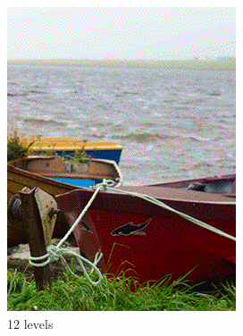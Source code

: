 \documentclass[]{article}
\begin{document}
\begin{figure}[!htbp]
	\begin{minipage}[b]{0.4\textwidth}
		\includegraphics[width=\textwidth]{img/dithering12}
		\caption{12 levels}
	\end{minipage}
	\hfill
	\begin{minipage}[b]{0.4\textwidth}

\end{minipage}
\end{figure}
\end{document}
